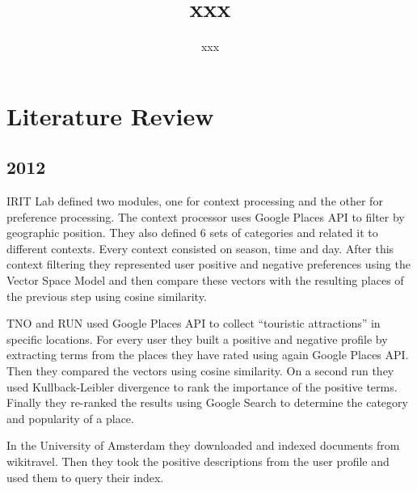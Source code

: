 \documentclass{llncs}
\begin{document}
\title{xxx}


\author{xxx}



\maketitle

\begin{abstract}

\begin{keywords}

\end{keywords}

\end{abstract}

\section{Literature Review}
\subsection{2012}

IRIT Lab \cite{hubert2012irit} defined two modules, one for context processing and the other for preference processing. The context processor uses Google Places API to filter by geographic position. They also defined 6 sets of categories and related it to different contexts. Every context consisted on season, time and day. After this context filtering they represented user positive and negative preferences using the Vector Space Model and then compare these vectors with the resulting places of the previous step using cosine similarity.

TNO and RUN \cite{sappelli2012tno} used Google Places API to collect ``touristic attractions'' in specific locations. For every user they built a positive and negative profile by extracting terms from the places they have rated using again Google Places API. Then they compared the vectors using cosine similarity. On a second run they used Kullback-Leibler divergence to rank the importance of the positive terms. Finally they re-ranked the results using Google Search to determine the category and popularity of a place.

In the University of Amsterdam \cite{Koolen_contextualsuggestion} they downloaded and indexed documents from wikitravel. Then they took the positive descriptions from the user profile and used them to query their index.
\end{document}
